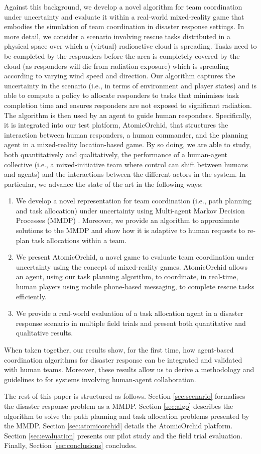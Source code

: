 Against this background, we develop a novel algorithm for team coordination under uncertainty and evaluate it within a real-world mixed-reality game that embodies the simulation of team coordination in disaster response settings. In more detail, we consider a scenario involving rescue tasks distributed in a physical space over which a (virtual) radioactive cloud is spreading. Tasks need to be completed by the responders before the area is completely covered by the cloud (as responders will die from radiation exposure) which is spreading according to varying wind speed and direction. Our algorithm captures the uncertainty in the scenario (i.e., in terms of environment and player states) and  is able to compute a policy to allocate responders to tasks that minimises task completion time and ensures responders are not exposed to significant radiation. The algorithm is then used by an agent to guide human responders. Specifically, it is integrated  into our test platform, AtomicOrchid, that structures the interaction between human responders, a human commander, and the planning agent in a mixed-reality location-based game. By so doing, we are able to study, both quantitatively and qualitatively, the performance of a human-agent collective (i.e., a mixed-initiative team where control can shift between humans and agents)  and the interactions between the different actors in the system. In particular, we  advance the state of the art in the following ways:
\begin{enumerate}
\item We develop a novel representation for team coordination (i.e., path planning and task allocation) under uncertainty using Multi-agent Markov Decision Processes (MMDP)  \cite{boutilier1996planning}. Moreover, we provide an algorithm to approximate solutions to the MMDP and show how it  is adaptive to human requests to re-plan task allocations within a team.
\item We present AtomicOrchid, a novel game to evaluate team coordination under uncertainty using the concept of mixed-reality games. AtomicOrchid allows an agent, using our task planning algorithm, to coordinate, in real-time, human players using mobile phone-based messaging, to complete rescue tasks efficiently.
\item We provide a real-world evaluation of a task allocation agent in a disaster response scenario in multiple field trials and present both quantitative and qualitative results. 
\end{enumerate}
When taken together, our results show, for the first time, how agent-based coordination algorithms for disaster response can be integrated and validated with human teams. Moreover, these results allow us to derive a methodology and guidelines to for systems involving  human-agent collaboration. 

The rest of this paper is structured as follows. Section \ref{sec:scenario} formalises the disaster response problem as a MMDP. Section \ref{sec:algo}  describes the algorithm to solve the path planning and task allocation problems presented by the MMDP. Section \ref{sec:atomicorchid}  details the AtomicOrchid platform. Section \ref{sec:evaluation} presents our pilot study and the  field trial evaluation.  Finally, Section \ref{sec:conclusions} concludes.